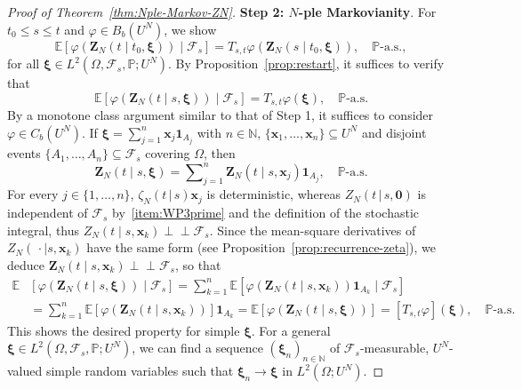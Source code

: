 \documentclass[reqno]{amsart}
\numberwithin{equation}{section}
\newcommand{\bbP}{\mathbb{P}}
\newcommand{\N}{\mathbb{N}}
\newcommand{\E}{\mathbb{E}}
\newcommand{\cF}{\mathcal{F}}
\newcommand{\ind}{\perp\!\!\!\perp}
\theoremstyle{remark}
\theoremstyle{definition}
\begin{document}
\begin{proof}[Proof of Theorem~\ref{thm:Nple-Markov-ZN}]
	\textbf{Step 2: $N$-ple Markovianity}.
	For $t_0 \le s \le t$ and $\varphi \in B_b\left(U^N\right)$, 
	we show
	\begin{equation}
		\E[\varphi(\mathbf Z_N(t\mid t_0, \bm\xi)) \mid \cF_{s}] 
		= 
		T_{s, t} \varphi(\mathbf Z_N(s \mid t_0, \bm\xi)),
		\quad
		\bbP\text{-a.s.},
	\end{equation}
	for all $\bm \xi \in L^2(\Omega, \cF_{s}, \bbP; U^N)$.
	By Proposition~\ref{prop:restart}, it suffices to 
	verify that 
	\begin{equation}
		\E[\varphi(\mathbf Z_N(t\mid s, \bm \xi)) \mid \cF_{s}] 
		= 
		T_{s, t} \varphi(\bm\xi),
		\quad
		\bbP\text{-a.s.}
	\end{equation}
	By a monotone
	class argument similar to that of Step 1, 
	it suffices to consider $\varphi \in C_b(U^N)$.
	If $\bm\xi = \sum_{j=1}^n \mathbf x_j \mathbf 1_{A_j}$ with $n \in \N$,
	$\{\mathbf x_1, \dots, \mathbf x_n\} \subseteq U^N$ and
	disjoint events
	$\{A_1, \dots, A_n\} \subseteq \cF_{s}$ covering $\Omega$,
	then
	\[
	\mathbf Z_N(t\mid s, \bm \xi)
	=
	\sum\nolimits_{j=1}^n \mathbf Z_N(t \mid s, \mathbf x_j) \mathbf 1_{A_j}, \quad \bbP\text{-a.s.}
	\]
	For every $j \in \{1,\dots,n\}$, $\zeta_N(t\,|\,s)\mathbf x_j$
	is deterministic, 
	whereas $Z_N(t \, | \, s, \bm 0)$ is independent of
	$\cF_{s}$ by~\eqref{item:WP3prime} and the definition of the stochastic integral,
	thus $Z_N(t \mid s, \mathbf x_k) \ind \cF_{s}$.
	Since the mean-square derivatives of ${Z_N(\,\cdot\mid s, \mathbf x_k)}$ have the same form
	(see Proposition~\ref{prop:recurrence-zeta}), 
	we deduce
	$\mathbf Z_N(t \mid s, \mathbf x_k) \ind \cF_{s}$, so that
	\begin{equation}
		\begin{aligned}
			\E&[\varphi(\mathbf Z_N(t\mid s, \bm \xi)) \mid \cF_{s}]
			=
			\sum\nolimits_{k=1}^n 
			\E[\varphi(\mathbf Z_N(t\mid s, \mathbf x_k)) \mathbf 1_{A_k} \mid \cF_{s}] 
			\\
			&=
			\sum\nolimits_{k=1}^n 
			\E[\varphi(\mathbf Z_N(t\mid s, \mathbf x_k))] \mathbf 1_{A_k}
			=
			\E[\varphi(\mathbf Z_N(t\mid s, \bm\xi))]
			=
			[T_{s, t}\varphi](\bm\xi),
			\quad
			\bbP\text{-a.s.}
		\end{aligned}
	\end{equation}
	This shows the desired property for simple $\bm\xi$.
	For a general $\bm \xi \in L^2(\Omega, \cF_{s}, \bbP; U^N)$, 
	we can find a sequence $(\bm \xi_n)_{n\in\N}$ of 
	$\cF_{s}$-measurable, $U^N$-valued simple 
	random variables such that $\bm\xi_n \to \bm\xi$ in $L^2(\Omega; U^N)$.

\end{proof}
\end{document}
